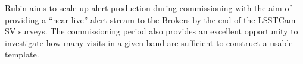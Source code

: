 Rubin aims to scale up alert production during commissioning with the aim of  providing a ``near-live'' alert stream to the Brokers by the end of the LSSTCam SV surveys.
The commissioning period also provides an excellent opportunity to investigate how many visits in a given band are sufficient to construct a usable template.

